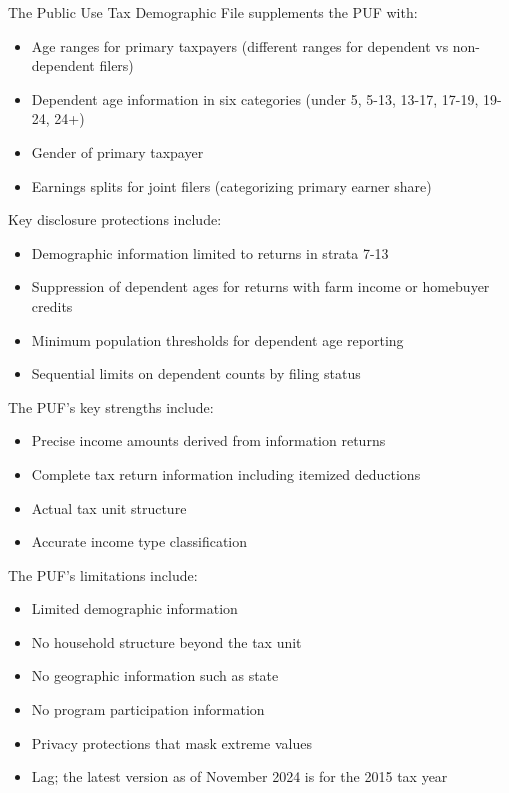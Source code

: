 The Public Use Tax Demographic File supplements the PUF with:
\begin{itemize}
    \item Age ranges for primary taxpayers (different ranges for dependent vs non-dependent filers)
    \item Dependent age information in six categories (under 5, 5-13, 13-17, 17-19, 19-24, 24+)
    \item Gender of primary taxpayer
    \item Earnings splits for joint filers (categorizing primary earner share)
\end{itemize}

Key disclosure protections include:
\begin{itemize}
    \item Demographic information limited to returns in strata 7-13
    \item Suppression of dependent ages for returns with farm income or homebuyer credits
    \item Minimum population thresholds for dependent age reporting
    \item Sequential limits on dependent counts by filing status
\end{itemize}

The PUF's key strengths include:
\begin{itemize}
    \item Precise income amounts derived from information returns
    \item Complete tax return information including itemized deductions
    \item Actual tax unit structure
    \item Accurate income type classification
\end{itemize}

The PUF's limitations include:
\begin{itemize}
    \item Limited demographic information
    \item No household structure beyond the tax unit
    \item No geographic information such as state
    \item No program participation information
    \item Privacy protections that mask extreme values
    \item Lag; the latest version as of November 2024 is for the 2015 tax year
\end{itemize}

